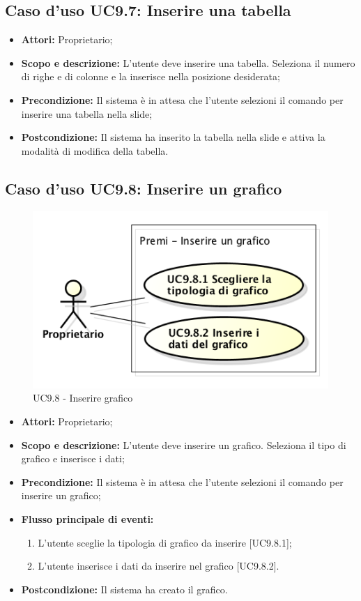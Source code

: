 \subsection{Caso d'uso UC9.7: Inserire una tabella}
\begin{itemize}
	\item \textbf{Attori:} Proprietario;
	\item \textbf{Scopo e descrizione:} L'utente deve inserire una tabella. Seleziona il numero di righe e di colonne e la inserisce nella posizione desiderata;
	\item \textbf{Precondizione:} Il sistema è in attesa che l'utente selezioni il comando per inserire una tabella nella \gls{slide};
	\item \textbf{Postcondizione:} Il sistema ha inserito la tabella nella \gls{slide} e attiva la modalità di modifica della tabella.
\end{itemize}


\subsection{Caso d'uso UC9.8: Inserire un grafico}
\begin{figure}[h] 
	\centering 
	\includegraphics[scale=0.45] {img/UC9.8.png}
	\caption{UC9.8 - Inserire grafico} 
\end{figure}

\begin{itemize}
	\item \textbf{Attori:} Proprietario;
	\item \textbf{Scopo e descrizione:} L'utente deve inserire un grafico. Seleziona il tipo di grafico e inserisce i dati;
	\item \textbf{Precondizione:} Il sistema è in attesa che l'utente selezioni il comando per inserire un grafico;
	\item \textbf{Flusso principale di eventi:}
	\begin{enumerate}
		\item L'utente sceglie la tipologia di grafico da inserire [UC9.8.1];
		\item L'utente inserisce i dati da inserire nel grafico [UC9.8.2].
	\end{enumerate}
	\item \textbf{Postcondizione:} Il sistema ha creato il grafico.
\end{itemize}

